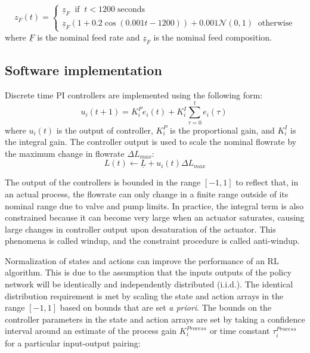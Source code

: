 \begin{equation}
	z_F(t) = 
	\begin{cases}
		\underline z_F \;\; \text{if}\;\; t < 1200 \;\text{seconds} \\
		\underline z_F(1+ 0.2\cos(0.001t-1200))+0.001 \mathcal{N}(0,1) \;\; \text{otherwise}
	\end{cases}
\end{equation}
where $\underline F$ is the nominal feed rate and $\underline z_F$ is the nominal feed composition.

\subsection{Software implementation}
Discrete time PI controllers are implemented using the following form:
	\begin{equation}
	u_i(t+1) = K_i^P e_i(t) +K_i^I \sum_{\tau=0}^{t}{e_i(\tau)}\ 
	\end{equation}
where $u_i(t)$ is the output of controller, $K_i^P$ is the proportional gain, and $K_i^I$ is the integral gain. The controller output is used to scale the nominal flowrate by the maximum change in flowrate $\Delta L_{max}$:
\begin{equation}
	L(t) \leftarrow \underline L + u_i(t)\Delta L_{max}
\end{equation}

The output of the controllers is bounded in the range $[-1,1]$ to reflect that, in an actual process, the flowrate can only change in a finite range outside of its nominal range due to valve and pump limits. In practice, the integral term is also constrained because it can become very large when an actuator saturates, causing large changes in controller output upon desaturation of the actuator. This phenomena is called windup, and the constraint procedure is called anti-windup.\cite{Riggs2006}

Normalization of states and actions can improve the performance of an RL algorithm.\cite{Engstrom2020} This is due to the assumption that the inputs outputs of the policy network will be identically and independently distributed (i.i.d.).  The identical distribution requirement is met by scaling the state and action arrays in the range $[-1,1]$ based on bounds that are set \emph{a priori}. The bounds on the controller parameters in the state and action arrays are set by taking a confidence interval around an estimate of the process gain $K_i^{Process}$ or time constant $\tau_i^{Process}$ for a particular input-output pairing\cite{Cai2009, Astrom2006}:

